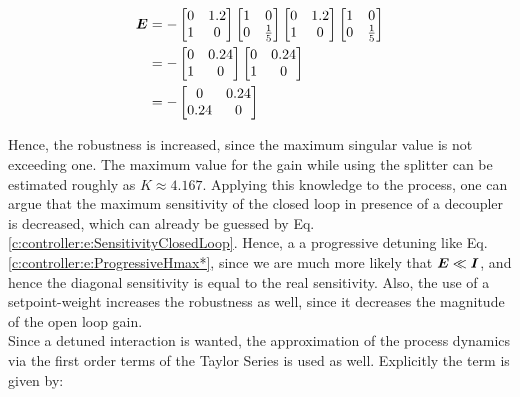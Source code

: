 \begin{align*}
\begin{split}
\mbox{\boldmath$E$} &= - \begin{bmatrix}
0 & 1.2 \\
1 & 0 
\end{bmatrix}\begin{bmatrix}
1 & 0 \\ 0 & \frac{1}{5}
\end{bmatrix}\begin{bmatrix}
0 & 1.2 \\
1 & 0 
\end{bmatrix}\begin{bmatrix}
1 & 0 \\ 0 & \frac{1}{5}
\end{bmatrix} \\
&= -  \begin{bmatrix}
0 & 0.24 \\
1 & 0 
\end{bmatrix}\begin{bmatrix}
0 & 0.24 \\ 1 & 0
\end{bmatrix} \\
&= -\begin{bmatrix}
0 & 0.24 \\ 0.24 & 0
\end{bmatrix}
\end{split}
\end{align*}

Hence, the robustness is increased, since the maximum singular value is not exceeding one. The maximum value for the gain while using the splitter can be estimated roughly as $K \approx 4.167$. Applying this knowledge to the process, one can argue that the maximum sensitivity of the closed loop in presence of a decoupler is decreased, which can already be guessed by Eq. \ref{c:controller:e:SensitivityClosedLoop}. Hence, a a progressive detuning like Eq.\ref{c:controller:e:ProgressiveHmax*}, since we are much more likely that $\mbox{\boldmath$E$} \ll \mbox{\boldmath$I$}$, and hence the diagonal sensitivity is equal to the real sensitivity. Also, the use of a setpoint-weight increases the robustness as well, since it decreases the magnitude of the open loop gain.\\ 

Since a detuned interaction is wanted, the approximation of the process dynamics via the first order terms of the Taylor Series is used as well. Explicitly the term is given by:

